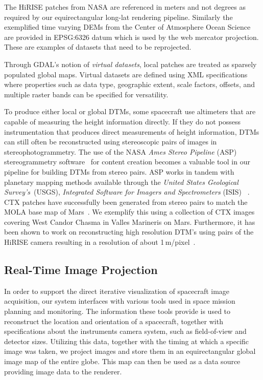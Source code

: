 \documentclass[journal]{vgtc}                %
\begin{document}
The HiRISE patches from NASA are referenced in meters and not degrees as required by our equirectangular long-lat rendering pipeline.
Similarly the exemplified time varying DEMs from the Center of Atmosphere Ocean Science are provided in EPSG:6326 datum which is used by the web mercator projection.
These are examples of datasets that need to be reprojected.

Through GDAL's notion of \emph{virtual datasets}, local patches are treated as sparsely populated global maps. Virtual datasets are defined using XML specifications where properties such as data type, geographic extent, scale factors, offsets, and multiple raster bands can be specified for versatility.

To produce either local or global DTMs, some spacecraft use altimeters that are capable of measuring the height information directly.
If they do not possess instrumentation that produces direct measurements of height information, DTMs can still often be reconstructed using stereoscopic pairs of images in stereophotogrammetry.
The use of the NASA \emph{Ames Stereo Pipeline} (ASP) stereogrammetry software~\cite{moratto2010ames} for content creation becomes a valuable tool in our pipeline for building DTMs from stereo pairs.
ASP works in tandem with planetary mapping methods available through the \emph{United States Geological Survey's}~(USGS), \emph{Integrated Software for Imagers and Spectrometers} (ISIS) ~\cite{gaddis1997overview}.
CTX patches have successfully been generated from stereo pairs to match the MOLA base map of Mars~\cite{broxton2008ames, mayer2016integrated}. We exemplify this using a collection of CTX images covering West Candor Chasma in Valles Marineris on Mars.
Furthermore, it has been shown to work on reconstructing high resolution DTM's using pairs of the HiRISE camera resulting in a resolution of about 1\,m/pixel~\cite{li2011rigorous}.

\subsection{Real-Time Image Projection} \label{sec:imageprojection}
In order to support the direct iterative visualization of spacecraft image acquisition, our system interfaces with various tools used in space mission planning and monitoring.
The information these tools provide is used to reconstruct the location and orientation of a spacecraft, together with specifications about the instruments camera system, such as field-of-view and detector sizes.
Utilizing this data, together with the timing at which a specific image was taken, we project images and store them in an equirectangular global image map of the entire globe. This map can then be used as a data source providing image data to the renderer.
\end{document}
